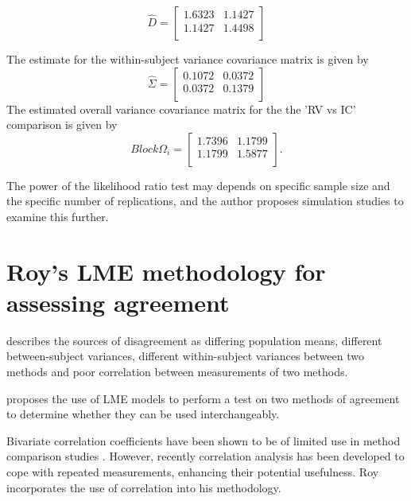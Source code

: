 \documentclass[12pt, a4paper]{article}
\theoremstyle{plain}
\theoremstyle{definition}
\theoremstyle{remark}
\begin{document}
\begin{equation}
\hat{D}= \left[ \begin{array}{cc}
  1.6323 & 1.1427  \\
  1.1427 & 1.4498 \\
\end{array} \right]
\end{equation}

The estimate for the within-subject variance covariance matrix is
given by
\begin{equation}
\hat{\Sigma}= \left[ \begin{array}{cc}
  0.1072 & 0.0372  \\
  0.0372 & 0.1379  \\
\end{array}\right]
\end{equation}
The estimated overall variance covariance matrix for the the 'RV
vs IC' comparison is given by
\begin{equation}
Block \Omega_{i}= \left[ \begin{array}{cc}
  1.7396 & 1.1799  \\
  1.1799 & 1.5877  \\
\end{array} \right].
\end{equation}

 The power of the
likelihood ratio test may depends on specific sample size and the
specific number of  replications, and the author proposes
simulation studies to examine this further.

\section{Roy's LME methodology for assessing agreement}

\citet{Barnhart}  describes the sources of disagreement as
differing population means, different between-subject variances,
different within-subject variances between two methods and poor
correlation between measurements of two methods.


\citet{ARoy2009}proposes the use of LME models to perform a test
on two methods of agreement to determine whether they can be used
interchangeably.

Bivariate correlation coefficients have been shown to be of
limited use in method comparison studies \citep{BA86}. However,
recently correlation analysis has been developed to cope with
repeated measurements, enhancing their potential usefulness. Roy
incorporates the use of correlation into his methodology.
\end{document}
